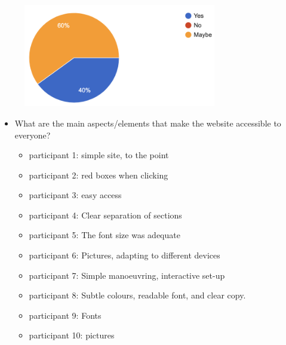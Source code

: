 \documentclass[letterpaper,12pt]{article}
\begin{document}
\begin{appendices}
\begin{figure}[h] 
\centerline{\includegraphics[width=0.75\textwidth]{report/images/user-survey-visually-impaired.png}}
{\label{fig:user-survey-visually-impaired}}
\end{figure}

\begin{itemize}
    \item What are the main aspects/elements that make the website accessible to everyone?
    \begin{itemize}
        \item 	participant 1: 	simple site, to the point
        \item 	participant 2: 	red boxes when clicking
        \item 	participant 3: 	easy access
        \item 	participant 4: 	Clear separation of sections
        \item 	participant 5: 	The font size was adequate 
        \item 	participant 6: 	Pictures, adapting to different devices
        \item 	participant 7: 	Simple manoeuvring, interactive set-up
        \item 	participant 8: 	Subtle colours, readable font, and clear copy.
        \item 	participant 9: 	Fonts
        \item 	participant 10: pictures
    \end{itemize}
\end{itemize}


\end{appendices}
\end{document}
